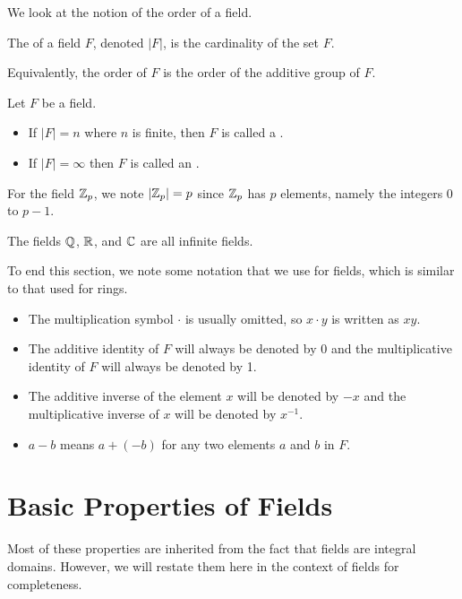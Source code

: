 We look at the notion of the order of a field.
\begin{definition}
    The  of a field $F$, denoted $|F|$, is the cardinality of the set $F$.
\end{definition}
\begin{remark}
    Equivalently, the order of $F$ is the order of the additive group of $F$.
\end{remark}

\begin{definition}
    Let $F$ be a field.
    \begin{itemize}
        \item If $|F| = n$ where $n$ is finite, then $F$ is called a .
        \item If $|F| = \infty$ then $F$ is called an .
    \end{itemize}
\end{definition}

\begin{example}
    For the field $\mathbb{Z}_p$, we note $|\mathbb{Z}_p| = p$ since $\mathbb{Z}_p$ has $p$ elements, namely the integers 0 to $p - 1$.
\end{example}
\begin{example}
    The fields $\mathbb{Q}$, $\mathbb{R}$, and $\mathbb{C}$ are all infinite fields.
\end{example}

To end this section, we note some notation that we use for fields, which is similar to that used for rings.
\begin{itemize}
    \item The multiplication symbol $\cdot$ is usually omitted, so $x \cdot y$ is written as $xy$.
    \item The additive identity of $F$ will always be denoted by 0 and the multiplicative identity of $F$ will always be denoted by 1.
    \item The additive inverse of the element $x$ will be denoted by $-x$ and the multiplicative inverse of $x$ will be denoted by $x^{-1}$.
    \item $a - b$ means $a + (-b)$ for any two elements $a$ and $b$ in $F$.
\end{itemize}



\section{Basic Properties of Fields}
Most of these properties are inherited from the fact that fields are integral domains. However, we will restate them here in the context of fields for completeness.


